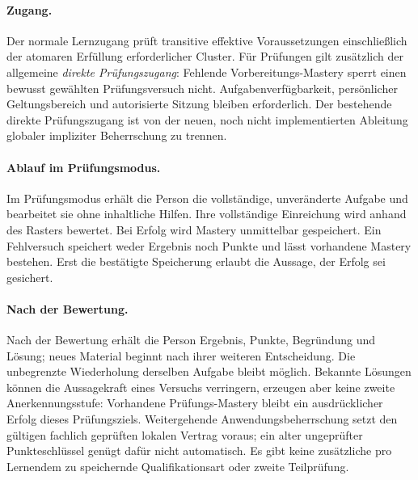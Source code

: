 \paragraph{Zugang.}
Der normale Lernzugang prüft transitive effektive Voraussetzungen einschließlich
der atomaren Erfüllung erforderlicher Cluster. Für Prüfungen gilt zusätzlich
der allgemeine \emph{direkte Prüfungszugang}: Fehlende Vorbereitungs-Mastery
sperrt einen bewusst gewählten Prüfungsversuch nicht. Aufgabenverfügbarkeit,
persönlicher Geltungsbereich und autorisierte Sitzung bleiben erforderlich.
Der bestehende direkte Prüfungszugang ist von der neuen, noch
nicht implementierten Ableitung globaler impliziter Beherrschung zu trennen.

\paragraph{Ablauf im Prüfungsmodus.}
Im Prüfungsmodus erhält die Person die vollständige, unveränderte Aufgabe
und bearbeitet sie ohne inhaltliche Hilfen. Ihre vollständige Einreichung
wird anhand des Rasters bewertet. Bei Erfolg wird Mastery unmittelbar
gespeichert. Ein Fehlversuch speichert weder Ergebnis noch Punkte und lässt
vorhandene Mastery bestehen. Erst die bestätigte Speicherung erlaubt die
Aussage, der Erfolg sei gesichert.

\paragraph{Nach der Bewertung.}
Nach der Bewertung erhält die Person Ergebnis, Punkte, Begründung und
Lösung; neues Material beginnt nach ihrer weiteren Entscheidung. Die
unbegrenzte Wiederholung derselben Aufgabe bleibt möglich. Bekannte Lösungen
können die Aussagekraft eines Versuchs verringern, erzeugen aber keine zweite
Anerkennungsstufe: Vorhandene Prüfungs-Mastery bleibt ein ausdrücklicher
Erfolg dieses Prüfungsziels. Weitergehende Anwendungsbeherrschung setzt den
gültigen fachlich geprüften lokalen Vertrag voraus; ein alter ungeprüfter
Punkteschlüssel genügt dafür nicht automatisch. Es gibt keine zusätzliche
pro Lernendem zu speichernde Qualifikationsart oder zweite Teilprüfung.


